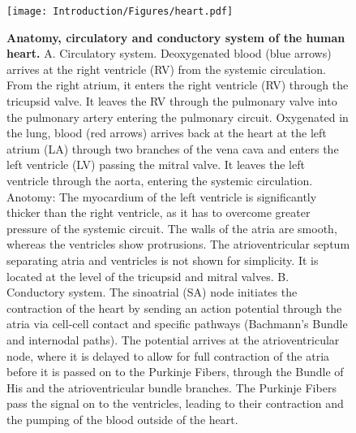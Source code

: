 \begin{figure}[htbp]
	\centering
	\texttt{[image: Introduction/Figures/heart.pdf]}
	\caption[\textbf{Anatomy, circulatory and conductory system of the human heart. }]{\textbf{Anatomy, circulatory and conductory system of the human heart. }A. Circulatory system. Deoxygenated blood (blue arrows) arrives at the right ventricle (RV) from the systemic circulation. From the right atrium, it enters the right ventricle (RV) through the tricupsid valve. It leaves the RV through the pulmonary valve into the pulmonary artery entering the pulmonary circuit. Oxygenated in the lung, blood (red arrows) arrives back at the heart at the left atrium (LA) through two branches of the vena cava and enters the left ventricle (LV) passing the mitral valve. It leaves the left ventricle through the aorta, entering the systemic circulation. Anotomy: The myocardium of the left ventricle is significantly thicker than the right ventricle, as it has to overcome greater pressure of the systemic circuit. The walls of the atria are smooth, whereas the ventricles show protrusions. The atrioventricular septum separating atria and ventricles is not shown for simplicity. It is located at the level of the tricupsid and mitral valves. B. Conductory system. The sinoatrial (SA) node initiates the contraction of the heart by sending an action potential through the atria via cell-cell contact and specific pathways (Bachmann's Bundle and internodal paths). The potential arrives at the atrioventricular node, where it is delayed to allow for full contraction of the atria before it is passed on to the Purkinje Fibers, through the Bundle of His and the atrioventricular bundle branches. The Purkinje Fibers pass the signal on to the ventricles, leading to their contraction and the pumping of the blood outside of the heart. } 
	 	\label{fig:heart}
\end{figure}
%
 

